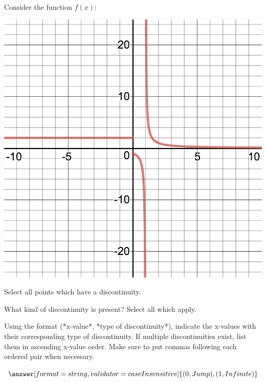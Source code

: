 \documentclass{ximera}
\begin{document}
\begin{question}
Consider the function $f(x)$:
\begin{image}
\includegraphics{continuity4}
\end{image}
Select all points which have a discontinuity.

\begin{selectAll}
\end{selectAll}

What kind of discontinuity is present? Select all which apply.

\begin{selectAll}
\end{selectAll}

Using the format (*x-value*, *type of discontinuity*), indicate the x-values with their corresponding type of discontinuity. If multiple discontinuities exist, list them in ascending x-value order. Make sure to put commas following each ordered pair when necessary.

$\answer[format=string,validator=caseInsensitive]{(0,Jump),(1,Infinite)}$
\end{question}
\end{document}
